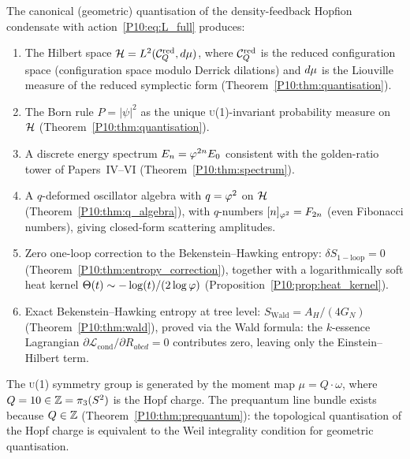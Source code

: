 \begin{theorem}
\label{P10:thm:main}
The canonical (geometric) quantisation of the density-feedback
Hopfion condensate with action~\eqref{P10:eq:L_full} produces:
\begin{enumerate}[label=\emph{(\roman*)}]
  \item The Hilbert space $\mathcal{H} = L^2(\mathcal{C}_Q^{\mathrm{red}},d\mu)$,
    where $\mathcal{C}_Q^{\mathrm{red}}$ is the reduced configuration space
    (configuration space modulo Derrick dilations)
    and $d\mu$ is the Liouville measure of the reduced
    symplectic form (Theorem~\ref{P10:thm:quantisation}).

  \item The Born rule $P=|\psi|^2$ as the unique
    \textsc{u}(1)-invariant probability measure
    on $\mathcal{H}$ (Theorem~\ref{P10:thm:quantisation}).

  \item A discrete energy spectrum $E_n = \varphi^{2n}E_0$
    consistent with the golden-ratio tower of Papers~IV--VI
    (Theorem~\ref{P10:thm:spectrum}).

  \item A $q$-deformed oscillator algebra with $q=\varphi^2$
    on $\mathcal{H}$ (Theorem~\ref{P10:thm:q_algebra}), with
    $q$-numbers $[n]_{\varphi^2}=F_{2n}$ (even Fibonacci numbers),
    giving closed-form scattering amplitudes.

  \item Zero one-loop correction to the Bekenstein--Hawking entropy:
    $\delta S_\mathrm{1-loop}=0$
    (Theorem~\ref{P10:thm:entropy_correction}), together with a
    logarithmically soft heat kernel
    $\Theta(t)\sim-\log(t)/(2\log\varphi)$
    (Proposition~\ref{P10:prop:heat_kernel}).

  \item Exact Bekenstein--Hawking entropy at tree level:
    $S_\mathrm{Wald}=A_H/(4G_N)$ (Theorem~\ref{P10:thm:wald}),
    proved via the Wald formula: the $k$-essence Lagrangian
    $\partial\mathcal{L}_\mathrm{cond}/\partial R_{abcd}=0$
    contributes zero, leaving only the Einstein--Hilbert term.
\end{enumerate}
The \textsc{u}(1) symmetry group is generated by the moment map
$\mu = Q\cdot\omega$, where $Q=10\in\mathbb{Z}=\pi_3(S^2)$ is the
Hopf charge.
The prequantum line bundle exists because $Q\in\mathbb{Z}$
(Theorem~\ref{P10:thm:prequantum}): the topological quantisation
of the Hopf charge is equivalent to the Weil integrality
condition for geometric quantisation.
\end{theorem}

